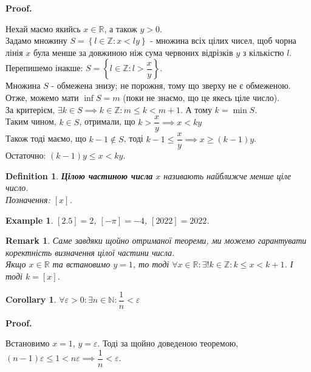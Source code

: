 \documentclass[a4paper, 14pt]{article}
\makeatletter
\def\qed{$\blacksquare$}
\theoremstyle{theoremdd}
\theoremstyle{theoremdd}
\newtheorem{definition}[theorem]{Definition}
\theoremstyle{theoremdd}
\theoremstyle{theoremdd}
\newtheorem{example}[theorem]{Example}
\theoremstyle{theoremdd}
\theoremstyle{theoremdd}
\newtheorem{remark}[theorem]{Remark}
\theoremstyle{theoremdd}
\theoremstyle{theoremdd}
\newtheorem{corollary}[theorem]{Corollary}
\renewenvironment{proof}[1][Proof.\\]{\par
\pushQED{\hfill \qed}%
\normalfont \topsep6\p@\@plus6\p@\relax
\trivlist
\item\relax
{\bfseries
#1\@addpunct{.}}\hspace\labelsep\ignorespaces
}{%
\popQED\endtrivlist\@endpefalse
}
\makeatother
\begin{document}
	\begin{proof}
	Нехай маємо якийсь $x \in \mathbb{R}$, а також $y > 0$.\\
	Задамо множину $S = \left\{l \in \mathbb{Z} :  x < ly \right\}$ - множина всіх цілих чисел, щоб чорна лінія $x$ була менше за довжиною ніж сума червоних відрізків $y$ з кількістю $l$.\\
	Перепишемо інакше: $S = \left\{l \in \mathbb{Z} :  l > \dfrac{x}{y} \right\}$.\\
	Множина $S$ - обмежена знизу; не порожня, тому що зверху не є обмеженою. Отже, можемо мати $\inf S = m$ (поки не знаємо, що це якесь ціле число). \\
	За критерієм, $\exists k \in S \implies k \in \mathbb{Z}: m \leq k < m+1$. А тому $k = \min S$.\\
	Таким чином, $k \in S$, отримали, що $k > \dfrac{x}{y} \implies x < ky$\\
	Також тоді маємо, що $k-1 \not \in S$, тоді $k-1 \leq \dfrac{x}{y} \implies x \geq (k-1)y$.\\
	Остаточно: $(k-1)y \leq x < ky$.
	\end{proof}
	
	\begin{definition}
	\textbf{Цілою частиною числа} $x$ називають найближче менше ціле число.\\
	Позначення: $[x]$.
	\end{definition}
	
	\begin{example}
	$[2.5] = 2$, $[-\pi] = -4$, $[2022] = 2022$.
	\end{example}
	
	\begin{remark}
	Саме завдяки щойно отриманої теореми, ми можемо гарантувати коректність визначення цілої частини числа.\\
	Якщо $x \in \mathbb{R}$ та встановимо $y = 1$, то тоді $\forall x \in \mathbb{R}: \exists !k \in \mathbb{Z}: k \leq x < k+1$. І тоді $k = [x]$.
	\end{remark}
	
	\begin{corollary}
	$\forall \varepsilon > 0: \exists n \in \mathbb{N}: \dfrac{1}{n} < \varepsilon$
	\end{corollary}
	
	\begin{proof}
	Встановимо $x = 1$, $y = \varepsilon$. Тоді за щойно доведеною теоремою, $(n-1)\varepsilon \leq 1 < n\varepsilon \implies \dfrac{1}{n} < \varepsilon$.
	\end{proof}
	
\end{document}
